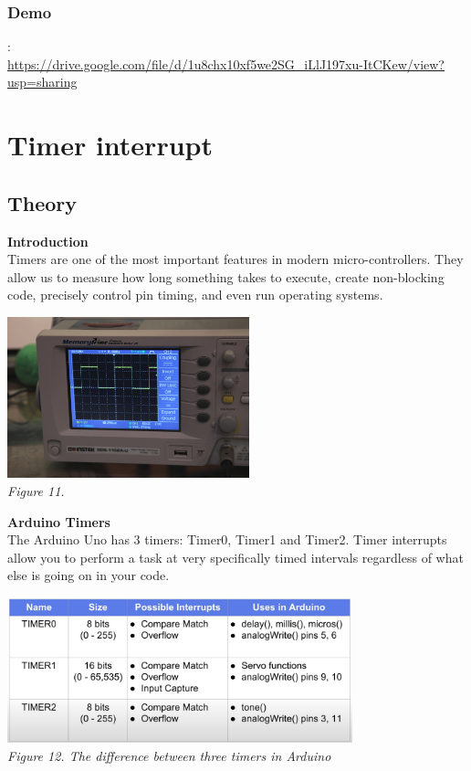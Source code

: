 \documentclass[a4paper]{article}
\begin{document}
\subsubsection{Demo}
\text{[Source]}:\\
\url{https://drive.google.com/file/d/1u8chx10xf5we2SG_iLlJ197xu-ItCKew/view?usp=sharing}

\newpage
\section{Timer interrupt}
\subsection{Theory}
\textbf{Introduction}\\
Timers are one of the most important features in modern micro-controllers. They allow us to measure how long something takes to execute, create non-blocking code, precisely control pin timing, and even run operating systems.
\medskip
\begin{center}
    \includegraphics[width=7cm]{pictures/14.jpg}\\
    \textit{Figure 11.}\\
\end{center}
\medskip
\textbf{Arduino Timers}\\
The Arduino Uno has 3 timers:  Timer0, Timer1 and Timer2. Timer interrupts allow you to perform a task at very specifically timed intervals regardless of what else is going on in your code.
\medskip
\begin{center}
    \includegraphics[width=10cm]{pictures/15.png}\\
    \textit{Figure 12. The difference between three timers in Arduino}\\
\end{center}
\end{document}
